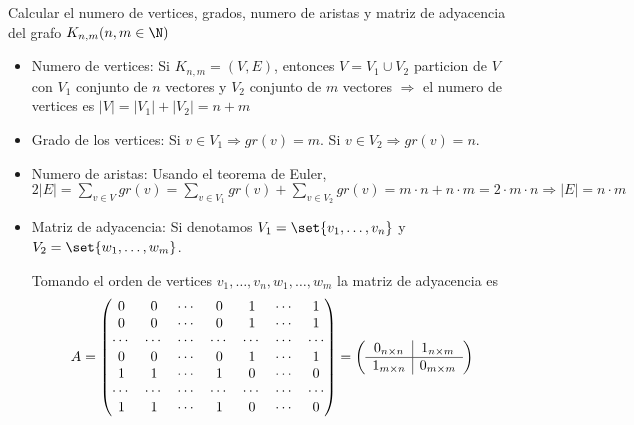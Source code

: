 \begin{example}
	Calcular el numero de vertices, grados, numero de aristas y matriz de adyacencia del grafo \(K_{n,m} (n,m \in \N )\)

	\begin{itemize}
		\item Numero de vertices: Si \(K_{n,m} = (V,E )\), entonces \(V = V_1 \cup V_2\) particion de \(V \) con \(V_1 \) conjunto de \(n \) vectores y \(V_2\) conjunto de \(m \) vectores \(\Rightarrow \) el numero de vertices es \(|V| = |V_1| + |V_2| = n + m \)
		\item Grado de los vertices: Si \(v \in V_1 \Rightarrow gr(v) = m \). Si \(v \in V_2 \Rightarrow gr(v) = n \).
		\item Numero de aristas: Usando el teorema de Euler, \(2|E| = \sum_{v \in V} gr(v) = \sum_{v \in V_1} gr(v) + \sum_{v \in V_2} gr(v) = m \cdot n + n \cdot m = 2 \cdot m \cdot n \Rightarrow |E| = n \cdot m   \)
		\item Matriz de adyacencia: Si denotamos \(V_1 = \set{v_1,\ldots,v_n}\) y \(V_2 = \set{w_1,\ldots,w_m}\).

		      Tomando el orden de vertices \(v_1,\ldots,v_n,w_1,\ldots,w_m \) la matriz de adyacencia es
		      \[
			      A = \begin{pmatrix}
				      0      & 0      & \cdots & 0      & 1      & \cdots & 1      \\
				      0      & 0      & \cdots & 0      & 1      & \cdots & 1      \\
				      \cdots & \cdots & \cdots & \cdots & \cdots & \cdots & \cdots \\
				      0      & 0      & \cdots & 0      & 1      & \cdots & 1      \\
				      1      & 1      & \cdots & 1      & 0      & \cdots & 0      \\
				      \cdots & \cdots & \cdots & \cdots & \cdots & \cdots & \cdots \\
				      1      & 1      & \cdots & 1      & 0      & \cdots & 0      \\
			      \end{pmatrix} =
			      \left ( \begin{array}[pos]{c|c}
					      0_{n\times n }  & 1_{n \times m } \\ \hline
					      1_{m \times n } & 0_{m \times m}  \\
				      \end{array} \right )
		      \]
	\end{itemize}
\end{example}

